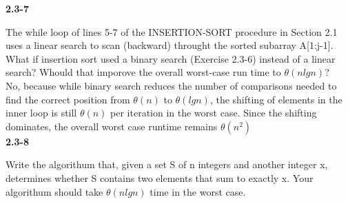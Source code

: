 \textbf{2.3-7}

The while loop of lines 5-7 of the INSERTION-SORT procedure in Section 2.1
uses a linear search to scan (backward) throught the sorted subarray A[1:j-1].
What if insertion sort used a binary search (Exercise 2.3-6) instead of a linear
search? Whould that imporove the overall worst-case run time to $\theta(nlgn)$? \\

No, because while binary search reduces the number of comparisons 
needed to find the correct position from $\theta(n)$ to $\theta(lg n)$, 
the shifting of elements in the inner loop is still $\theta(n)$ per iteration in 
the worst case. Since the shifting dominates, the overall worst case runtime 
remains $\theta(n^2)$\\

\textbf{2.3-8}

Write the algorithum that, given a set S of n integers and another integer x, determines whether S contains two elements
that sum to exactly x. Your algorithum should take $\theta(nlgn)$ time in the worst case. \\

